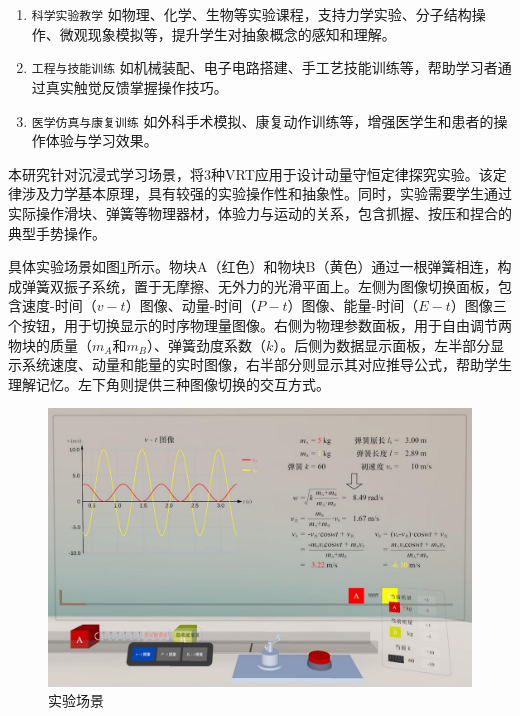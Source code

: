 \documentclass[runningheads]{llncs}
\begin{document}
\begin{enumerate}[label={\arabic*)}]
  \item \texttt{科学实验教学} 如物理、化学、生物等实验课程，支持力学实验、分子结构操作、微观现象模拟等，提升学生对抽象概念的感知和理解。
  \item \texttt{工程与技能训练} 如机械装配、电子电路搭建、手工艺技能训练等，帮助学习者通过真实触觉反馈掌握操作技巧。
  \item \texttt{医学仿真与康复训练} 如外科手术模拟、康复动作训练等，增强医学生和患者的操作体验与学习效果。
\end{enumerate}

本研究针对沉浸式学习场景，将3种VRT应用于设计动量守恒定律探究实验。该定律涉及力学基本原理，具有较强的实验操作性和抽象性。同时，实验需要学生通过实际操作滑块、弹簧等物理器材，体验力与运动的关系，包含抓握、按压和捏合的典型手势操作。

具体实验场景如图\ref{fig:experiment-scenario}所示。物块A（红色）和物块B（黄色）通过一根弹簧相连，构成弹簧双振子系统，置于无摩擦、无外力的光滑平面上。左侧为图像切换面板，包含速度-时间（$v-t$）图像、动量-时间（$P-t$）图像、能量-时间（$E-t$）图像三个按钮，用于切换显示的时序物理量图像。右侧为物理参数面板，用于自由调节两物块的质量（$m_A$和$m_B$）、弹簧劲度系数（$k$）。后侧为数据显示面板，左半部分显示系统速度、动量和能量的实时图像，右半部分则显示其对应推导公式，帮助学生理解记忆。左下角则提供三种图像切换的交互方式。

\begin{figure}[t]
  \centering
  \includegraphics[width=1\textwidth]{image/experiment-scenario.pdf}
  \caption{实验场景}
  \label{fig:experiment-scenario}
\end{figure}

\end{document}
